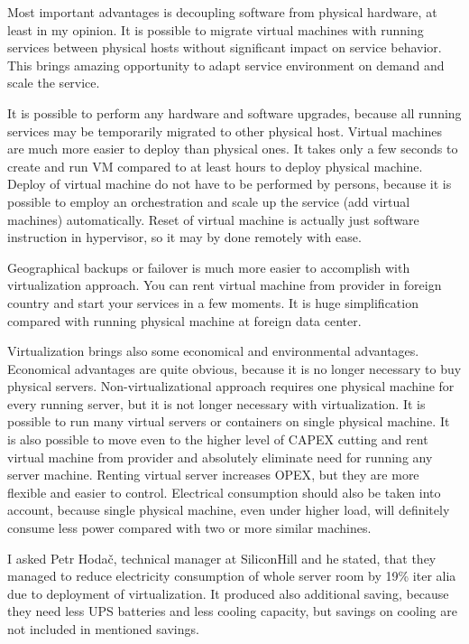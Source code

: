 
Most important advantages is decoupling software from physical hardware, at least in my opinion. It is possible to migrate virtual machines with running services between physical hosts without significant impact on service behavior. This brings amazing opportunity to adapt service environment on demand and scale the service.

It is possible to perform any hardware and software upgrades, because all running services may be temporarily migrated to other physical host. Virtual machines are much more easier to deploy than physical ones. It takes only a few seconds to create and run \Ac{VM} compared to at least hours to deploy physical machine. Deploy of virtual machine do not have to be performed by persons, because it is possible to employ an orchestration and scale up the service (add virtual machines) automatically.
Reset of virtual machine is actually just software instruction in hypervisor, so it may by done remotely with ease.

Geographical backups or failover is much more easier to accomplish with virtualization approach. You can rent virtual machine from provider in foreign country and start your services in a few moments. It is huge simplification compared with running physical machine at foreign data center.

Virtualization brings also some economical and environmental advantages. Economical advantages are quite obvious, because it is no longer necessary to buy physical servers. Non-virtualizational approach requires one physical machine for every running server, but it is not longer necessary with virtualization. It is possible to run many virtual servers or containers on single physical machine. It is also possible to move even to the higher level of \Ac{CAPEX} cutting and rent virtual machine from provider and absolutely eliminate need for running any server machine. Renting virtual server increases \Ac{OPEX}, but they are more flexible and easier to control.
Electrical consumption should also be taken into account, because single physical machine, even under higher load, will definitely consume less power compared with two or more similar machines. 

I asked Petr Hodač, technical manager at SiliconHill and he stated, that they managed to reduce electricity consumption of whole server room by 19\% iter alia due to deployment of virtualization. It produced also additional saving, because they need less \Ac{UPS} batteries and less cooling capacity, but savings on cooling are not included in mentioned savings.

